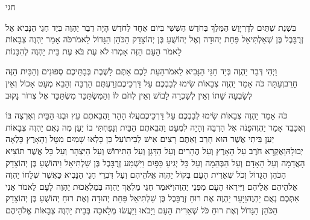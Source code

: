 \documentclass[../main/main.tex]{subfiles}
\begin{document}
\Incipit{}חגי\par
\vspace{\afterchapskip}
\RTLmulticolcolumns
\begin{multicols}{\ncols}
בִּשְׁנַת שְׁתַּיִם לְדָרְיָוֶשׁ הַמֶּלֶךְ בַּחֹדֶשׁ הַשִּׁשִּׁי בְּיוֹם אֶחָד לַחֹדֶשׁ הָיָה דְבַר יַהְוֶה בְּיַד חַגַּי הַנָּבִיא אֶל זְרֻבָּבֶל בֶּן שְׁאַלְתִּיאֵל פַּחַת יְהוּדָה וְאֶל יְהוֹשֻׁעַ בֶּן יְהוֹצָדָק הַכֹּהֵן הַגָּדוֹל לֵאמֹר\PreVerseSpace{}כֹּה אָמַר יַהְוֶה צְבָאוֹת לֵאמֹר הָעָם הַזֶּה אָמְרוּ לֹא עֶת בֹּא עֶת בֵּית יַהְוֶה לְהִבָּנוֹת\OpenSection{}\par
{}וַיְהִי דְּבַר יַהְוֶה בְּיַד חַגַּי הַנָּבִיא לֵאמֹר\PreVerseSpace{}הַעֵת לָכֶם אַתֶּם לָשֶׁבֶת בְּבָתֵּיכֶם סְפוּנִים וְהַבַּיִת הַזֶּה חָרֵב\PreVerseSpace{}וְעַתָּה כֹּה אָמַר יַהְוֶה צְבָאוֹת שִׂימוּ לְבַבְכֶם עַל דַּרְכֵיכֶם\PreVerseSpace{}זְרַעְתֶּם הַרְבֵּה וְהָבֵא מְעָט אָכוֹל וְאֵין לְשָׂבְעָה שָׁתוֹ וְאֵין לְשָׁכְרָה לָבוֹשׁ וְאֵין לְחֹם לוֹ וְהַמִּשְׂתַּכֵּר מִשְׂתַּכֵּר אֶל צְרוֹר נָקוּב\OpenSection{}\par
{}כֹּה אָמַר יַהְוֶה צְבָאוֹת שִׂימוּ לְבַבְכֶם עַל דַּרְכֵיכֶם\PreVerseSpace{}עֲלוּ הָהָר וַהֲבֵאתֶם עֵץ וּבְנוּ הַבָּיִת וְאֶרְצֶה בּוֹ וְאֶכָּבֵד אָמַר יַהְוֶה\PreVerseSpace{}פָּנֹה אֶל הַרְבֵּה וְהָיָה\SubEnd{} לִמְעָט וַהֲבֵאתֶם הַבַּיִת וְנָפַחְתִּי בוֹ יַעַן מֶה נְאֻם יַהְוֶה צְבָאוֹת יַעַן בֵּיתִי אֲשֶׁר הוּא חָרֵב וְאַתֶּם רָצִים אִישׁ לְבֵיתוֹ\PreVerseSpace{}עַל כֵּן  כָּלְאוּ שָׁמַיִם מִטָּל וְהָאָרֶץ כָּלְאָה יְבוּלָהּ\PreVerseSpace{}וָאֶקְרָא חֹרֶב עַל הָאָרֶץ וְעַל הֶהָרִים וְעַל הַדָּגָן וְעַל הַתִּירוֹשׁ וְעַל הַיִּצְהָר וְעַל כָּל\OmitEnd{} אֲשֶׁר תּוֹצִיא הָאֲדָמָה וְעַל הָאָדָם וְעַל הַבְּהֵמָה וְעַל כָּל יְגִיעַ כַּפָּיִם \ClosedSection{}וַיִּשְׁמַע זְרֻבָּבֶל בֶּן שַׁלְתִּיאֵל וִיהוֹשֻׁעַ בֶּן יְהוֹצָדָק הַכֹּהֵן הַגָּדוֹל וְכֹל שְׁאֵרִית הָעָם בְּקוֹל יַהְוֶה אֱלֹהֵיהֶם וְעַל דִּבְרֵי חַגַּי הַנָּבִיא כַּאֲשֶׁר שְׁלָחוֹ יַהְוֶה אֱלֹהֵיהֶם אֲלֵיהֶם\OmitEnd{} וַיִּירְאוּ הָעָם מִפְּנֵי יַהְוֶה\PreVerseSpace{}וַיֹּאמֶר חַגַּי מַלְאַךְ יַהְוֶה בְּמַלְאֲכוּת יַהְוֶה לָעָם לֵאמֹר אֲנִי אִתְּכֶם נְאֻם יַהְוֶה\PreVerseSpace{}וַיָּעַר יַהְוֶה אֶת רוּחַ זְרֻבָּבֶל בֶּן שַׁלְתִּיאֵל פַּחַת יְהוּדָה וְאֶת רוּחַ יְהוֹשֻׁעַ בֶּן יְהוֹצָדָק הַכֹּהֵן הַגָּדוֹל וְאֶת רוּחַ כֹּל שְׁאֵרִית הָעָם וַיָּבֹאוּ וַיַּעֲשׂוּ מְלָאכָה בְּבֵית יַהְוֶה צְבָאוֹת אֱלֹהֵיהֶם\OpenSection{}\par

\end{multicols}
\end{document}
